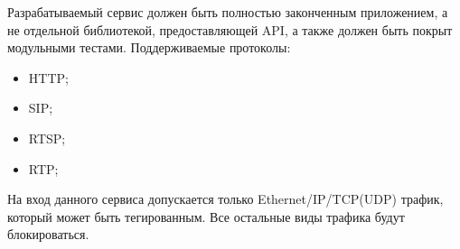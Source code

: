 Разрабатываемый сервис должен быть полностью законченным приложением, а не отдельной библиотекой, предоставляющей API, а также должен быть покрыт модульными тестами. Поддерживаемые протоколы:
\begin{itemize}
\item HTTP;
\item SIP;
\item RTSP;
\item RTP;
\end{itemize}

На вход данного сервиса допускается только Ethernet/IP/TCP(UDP) трафик, который может быть тегированным. Все остальные виды трафика будут блокироваться.
